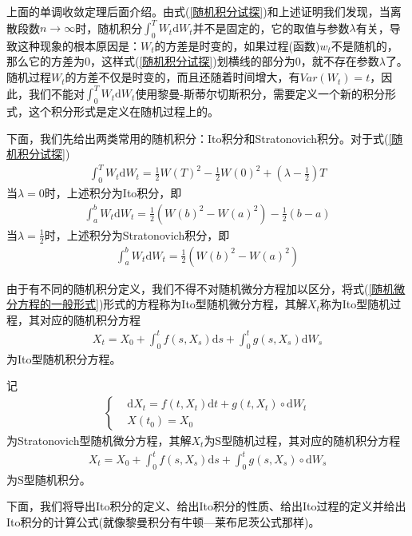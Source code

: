         \par
        上面的单调收敛定理后面介绍。由式(\ref{随机积分试探})和上述证明我们发现，当离散段数$n\rightarrow \infty$时，随机积分$\int_0^T W_t \mathrm{d}W_t$并不是固定的，它的取值与参数$\lambda$有关，导致这种现象的根本原因是：$W_t$的方差是时变的，如果过程(函数)$w_t$不是随机的，那么它的方差为$0$，这样式(\ref{随机积分试探})划横线的部分为$0$，就不存在参数$\lambda$了。随机过程$W_t$的方差不仅是时变的，而且还随着时间增大，有$Var(W_t) = t$，因此，我们不能对$\int_0^T W_t \mathrm{d}W_t$使用黎曼-斯蒂尔切斯积分，需要定义一个新的积分形式，这个积分形式是定义在随机过程上的。
        \par
        下面，我们先给出两类常用的随机积分：Ito积分和Stratonovich积分。对于式(\ref{随机积分试探})
        \begin{align*}
            \int_0 ^T W_t \mathrm{d}W_t
            =\frac{1}{2} W(T)^2 - \frac{1}{2}W(0)^2 + (\lambda -\frac{1}{2})T
        \end{align*}
        当$\lambda = 0$时，上述积分为Ito积分，即
        \begin{align*}
            \int_a^b W_t \mathrm{d}W_t = \frac{1}{2} (W(b)^2 - W(a)^2) - \frac{1}{2} (b-a)
        \end{align*}
        当$\lambda = \frac{1}{2}$时，上述积分为Stratonovich积分，即
        \begin{align*}
            \int_a^b W_t \mathrm{d}W_t = \frac{1}{2} (W(b)^2 - W(a)^2)
        \end{align*}
        \par
        由于有不同的随机积分定义，我们不得不对随机微分方程加以区分，将式(\ref{随机微分方程的一般形式})形式的方程称为Ito型随机微分方程，其解$X_t$称为Ito型随机过程，其对应的随机积分方程
        \begin{align*}
            X_t = X_0+\int_0^t f(s,X_s)\mathrm{d}s + \int_0^t g(s,X_s)\mathrm{d}W_s
        \end{align*}
        为Ito型随机积分方程。
        \par
        记
        \begin{align*}
            \left\{
                \begin{aligned}
                &\mathrm{d}X_t = f(t,X_t) \mathrm{d}t +g(t,X_t) \circ \mathrm{d}W_t \\
                &X(t_0) = X_0
                \end{aligned}
            \right.
        \end{align*}
        为Stratonovich型随机微分方程，其解$X_t$为S型随机过程，其对应的随机积分方程
        \begin{align*}
            X_t = X_0+\int_0^t f(s,X_s)\mathrm{d}s + \int_0^t g(s,X_s) \circ \mathrm{d}W_s
        \end{align*}
        为S型随机积分。
        \par
        下面，我们将导出Ito积分的定义、给出Ito积分的性质、给出Ito过程的定义并给出Ito积分的计算公式(就像黎曼积分有牛顿—莱布尼茨公式那样)。
